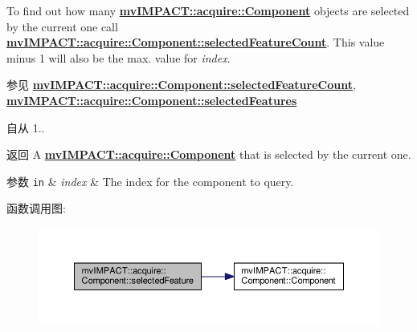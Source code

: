 To find out how many {\bfseries \hyperlink{classmv_i_m_p_a_c_t_1_1acquire_1_1_component}{mv\+I\+M\+P\+A\+C\+T\+::acquire\+::\+Component}} objects are selected by the current one call {\bfseries \hyperlink{classmv_i_m_p_a_c_t_1_1acquire_1_1_component_a17a328102430e483790a06769f85ea47}{mv\+I\+M\+P\+A\+C\+T\+::acquire\+::\+Component\+::selected\+Feature\+Count}}. This value minus 1 will also be the max. value for {\itshape index}. \begin{DoxySeeAlso}{参见}
{\bfseries \hyperlink{classmv_i_m_p_a_c_t_1_1acquire_1_1_component_a17a328102430e483790a06769f85ea47}{mv\+I\+M\+P\+A\+C\+T\+::acquire\+::\+Component\+::selected\+Feature\+Count}}, ~\newline
{\bfseries \hyperlink{classmv_i_m_p_a_c_t_1_1acquire_1_1_component_a8be119dbf4cc277280df78b2570a8b80}{mv\+I\+M\+P\+A\+C\+T\+::acquire\+::\+Component\+::selected\+Features}} 
\end{DoxySeeAlso}
\begin{DoxySince}{自从}
1..
\end{DoxySince}
\begin{DoxyReturn}{返回}
A {\bfseries \hyperlink{classmv_i_m_p_a_c_t_1_1acquire_1_1_component}{mv\+I\+M\+P\+A\+C\+T\+::acquire\+::\+Component}} that is selected by the current one. 
\end{DoxyReturn}

\begin{DoxyParams}[1]{参数}
\mbox{\tt in}  & {\em index} & The index for the component to query. \\
\hline
\end{DoxyParams}


函数调用图\+:
\nopagebreak
\begin{figure}[H]
\begin{center}
\leavevmode
\includegraphics[width=350pt]{classmv_i_m_p_a_c_t_1_1acquire_1_1_component_a38e5f6370991cf77ca8cdd3ecc99e64a_cgraph}
\end{center}
\end{figure}


